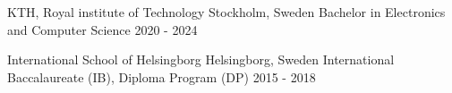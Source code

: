 \documentclass[../main.tex]{subfiles}
\begin{document}
\company
    {KTH, Royal institute of Technology} 
    {Stockholm, Sweden}
\titles
    {Bachelor in Electronics and Computer Science} 
    {2020 - 2024} 

\company
    {International School of Helsingborg} 
    {Helsingborg, Sweden}
\titles
    {International Baccalaureate (IB), Diploma Program (DP)} 
    {2015 - 2018} 
    
\end{document}
